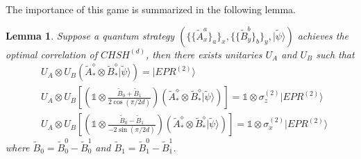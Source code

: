 \documentclass[11pt,letterpaper]{article}
\newcommand{\ket}[1]{|#1\rangle}
\newcommand{\x}{\otimes}
\newcommand{\1}{\mathbb{1}}
\newcommand{\CHSH}{CHSH^{(d)}}
\newcommand{\EPR}[1]{EPR^{(#1)}}
\newcommand{\paulix}[1]{\sigma_x^{(#1)}}
\newcommand{\pauliz}[1]{\sigma_z^{(#1)}}
\newcommand{\tA}{\tilde{A}}
\newcommand{\tB}{\tilde{B}}
\newcommand{\tpsi}{\tilde{\psi}}
\newtheorem{lemma}[theorem]{Lemma}
\theoremstyle{definition}
\begin{document}
The importance of this game is summarized in the following lemma.
\begin{lemma}
	\label{lm:chsh_comp}
	Suppose a quantum strategy $\left(\{\{\tA_x^a\}_a\}_x, \{\{\tB_y^b\}_b\}_y, \ket{\tpsi}\right)$
	achieves the optimal correlation of $\CHSH$, then there exists unitaries $U_A$ and $U_B$ 
	such that 
	\begin{align*}
		&U_A\x U_B \left(\tA_\ast^\diamond \x \tB_\ast^\diamond \ket{\tpsi}\right) = \ket{\EPR{2}} \\
		&U_A\x U_B \left[\left(\1 \x  \frac{\tB_0 + \tB_1}{2\cos(\pi/2d)}\right)\left(\tA_\ast^\diamond \x \tB_\ast^\diamond \ket{\tpsi}\right) \right]
		=\1 \x \pauliz{2} \ket{\EPR{2}} \\
		&U_A\x U_B \left[\left(\1 \x  \frac{\tB_0 - \tB_1}{-2\sin(\pi/2d)}\right)\left(\tA_\ast^\diamond \x \tB_\ast^\diamond \ket{\tpsi}\right) \right]
		=\1 \x \paulix{2} \ket{\EPR{2}} 
	\end{align*}
	where $\tB_0 = \tB_0^0 - \tB_0^1$ and $\tB_1 = \tB_1^0 - \tB_1^1$.
\end{lemma}
\end{document}
